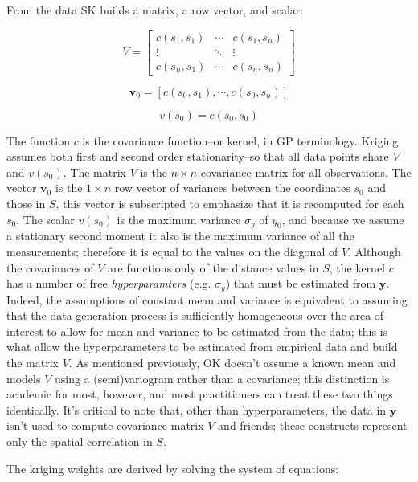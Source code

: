 \documentclass[]{interact}
\theoremstyle{plain}%
\theoremstyle{definition}
\theoremstyle{remark}
\begin{document}
From the data SK builds a matrix, a row vector, and scalar:

\[V=
  \begin{bmatrix}
    c(s_1, s_1) & \cdots & c(s_1, s_n) \\
    \vdots      & \ddots & \vdots \\
    c(s_n, s_1) & \cdots & c(s_n, s_n)
  \end{bmatrix}
\]

\[\bm{v}_0=[c(s_0, s_1), \cdots, c(s_0, s_n)]\]

\[v(s_0)=c(s_0, s_0)\]

The function $c$ is the covariance function--or kernel, in GP terminology.  Kriging assumes both first and second order stationarity--so that all data points share $V$ and $v(s_0)$.  The matrix $V$ is the $n \times n$ covariance matrix for all observations.  The vector $\bm{v}_0$ is the $1 \times n$ row vector of variances between the coordinates $s_0$ and those in $S$, this vector is subscripted to emphasize that it is recomputed for each $s_0$.  The scalar $v(s_0)$ is the maximum variance $\sigma_{y}$ of $y_0$, and because we assume a stationary second moment it also is the maximum variance of all the measurements; therefore it is equal to the values on the diagonal of $V$.  Although the covariances of $V$ are functions only of the distance values in $S$, the kernel $c$ has a number of free {\em hyperparamters} (e.g. $\sigma_y$) that must be estimated from $\bm{y}$.  Indeed, the assumptions of constant mean and variance is equivalent to assuming that the data generation process is sufficiently homogeneous over the area of interest to allow for mean and variance to be estimated from the data; this is what allow the hyperparameters to be estimated from empirical data and build the matrix $V$.  As mentioned previously, OK doesn't assume a known mean and models $V$ using a (semi)variogram rather than a covariance; this distinction is academic for most, however, and most practitioners can treat these two things identically.  It's critical to note that, other than hyperparameters, the data in $\bm{y}$ isn't used to compute covariance matrix $V$ and friends; these constructs represent only the spatial correlation in $S$.


The kriging weights are derived by solving the system of equations:
\end{document}
